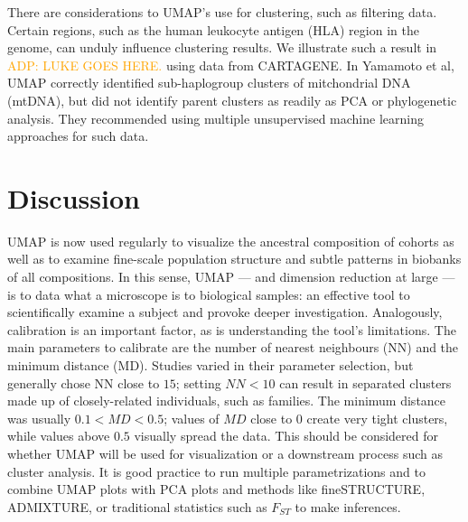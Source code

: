 \documentclass[12pt]{article}
\newcommand{\adpcomment}[1]{{\textcolor{orange}{ADP: #1}}}
\begin{document}
There are considerations to UMAP's use for clustering, such as filtering data. Certain regions, such as the human leukocyte antigen (HLA) region in the genome, can unduly influence clustering results. We illustrate such a result in \adpcomment{LUKE GOES HERE.} using data from CARTAGENE. In Yamamoto et al, UMAP correctly identified sub-haplogroup clusters of mitchondrial DNA (mtDNA), but did not identify parent clusters as readily as PCA or phylogenetic analysis. They recommended using multiple unsupervised machine learning approaches for such data\cite{yamamoto_genetic_2020}. 

\section*{Discussion}


UMAP is now used regularly to visualize the ancestral composition of cohorts as well as to examine fine-scale population structure and subtle patterns in biobanks of all compositions. In this sense, UMAP --- and dimension reduction at large --- is to data what a microscope is to biological samples: an effective tool to scientifically examine a subject and provoke deeper investigation. Analogously, calibration is an important factor, as is understanding the tool's limitations. The main parameters to calibrate are the number of nearest neighbours (NN) and the minimum distance (MD). Studies varied in their parameter selection, but generally chose NN close to $15$; setting $NN < 10$ can result in separated clusters made up of closely-related individuals, such as families. The minimum distance was usually $0.1 < MD < 0.5$; values of $MD$ close to $0$ create very tight clusters, while values above $0.5$ visually spread the data. This should be considered for whether UMAP will be used for visualization or a downstream process such as cluster analysis. It is good practice to run multiple parametrizations and to combine UMAP plots with PCA plots and methods like fineSTRUCTURE\cite{lawson2012inference}, ADMIXTURE\cite{alexander2009fast}, or traditional statistics such as $F_{ST}$ to make inferences.
\end{document}
